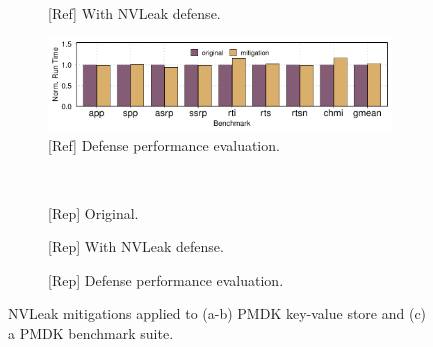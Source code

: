 \begin{figure}[t]
\begin{subfigure}[b]{.24\linewidth}
        \caption{[Ref] With NVLeak defense.}
        \label{fig:16:ref:pmdk-kv-memory-layout-secure}
    \end{subfigure}
    \begin{subfigure}[b]{.48\linewidth}
        \centering
        \includegraphics[width=\linewidth]{figure/plot/reference/fig16-mitigation-performance.tikz.pdf}
        \caption{[Ref] Defense performance evaluation.}
        \label{fig:16:ref:defense-perf}
    \end{subfigure}
    \\
    \begin{subfigure}[b]{.24\linewidth}
        \centering
        \caption{[Rep] Original.}
        \label{fig:16:rep:pmdk-kv-memory-layout-original}
    \end{subfigure}
    \begin{subfigure}[b]{.24\linewidth}
        \centering
        \caption{[Rep] With NVLeak defense.}
        \label{fig:16:rep:pmdk-kv-memory-layout-secure}
    \end{subfigure}
    \begin{subfigure}[b]{.48\linewidth}
        \centering
        \caption{[Rep] Defense performance evaluation.}
        \label{fig:16:rep:defense-perf}
    \end{subfigure}
    \caption{NVLeak mitigations applied to (a-b) PMDK key-value store and (c) a PMDK benchmark suite.}
    \label{fig:16:nvleak-defense}

\end{figure}
